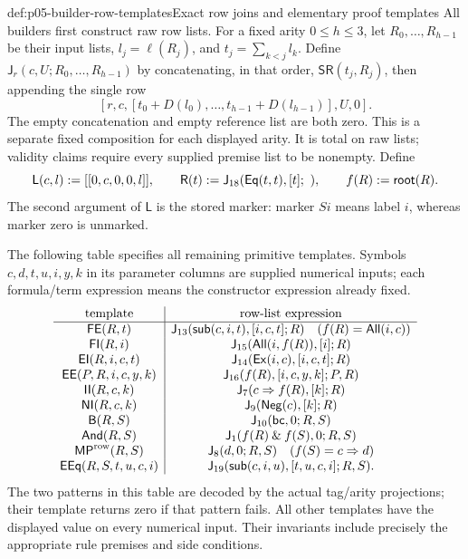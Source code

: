 \begin{hbdefinition}{def:p05-builder-row-templates}{Exact row joins and elementary proof templates}
All builders first construct raw row lists. For a fixed arity
\(0\leq h\leq3\), let \(R_0,\ldots,R_{h-1}\) be their input lists,
\(l_j=\ell(R_j)\), and \(t_j=\sum_{k<j}l_k\). Define
\(\mathsf{J}_r(c,U;R_0,\ldots,R_{h-1})\) by concatenating, in that
order, \(\mathsf{SR}(t_j,R_j)\), then appending the single row
\[
 [r,c,[t_0+D(l_0),\ldots,t_{h-1}+D(l_{h-1})],U,0].
\]
The empty concatenation and empty reference list are both zero. This is a
separate fixed composition for each displayed arity. It is total on raw
lists; validity claims require every supplied premise list to be nonempty.
Define
\[
 \mathsf{L}(c,l)\mathrel{:=}[[0,c,0,0,l]],\qquad
 \mathsf{R}(t)\mathrel{:=}\mathsf{J}_{18}(\mathsf{Eq}(t,t),[t];\ ),
 \qquad f(R)\mathrel{:=}\mathsf{root}(R).
\]
The second argument of \(\mathsf L\) is the stored marker: marker \(Si\)
means label \(i\), whereas marker zero is unmarked.

The following table specifies all remaining primitive templates. Symbols
\(c,d,t,u,i,y,k\) in its parameter columns are supplied numerical inputs;
each formula/term expression means the constructor expression already fixed.
\[
\begin{array}{c|c}
\text{template}&\text{row-list expression}\\\hline
 \mathsf{FE}(R,t)&
 \mathsf J_{13}(\mathsf{sub}(c,i,t),[i,c,t];R)
       \quad(f(R)=\mathsf{All}(i,c))\\
 \mathsf{FI}(R,i)&\mathsf J_{15}(\mathsf{All}(i,f(R)),[i];R)\\
 \mathsf{EI}(R,i,c,t)&\mathsf J_{14}(\mathsf{Ex}(i,c),[i,c,t];R)\\
 \mathsf{EE}(P,R,i,c,y,k)&\mathsf J_{16}(f(R),[i,c,y,k];P,R)\\
 \mathsf{II}(R,c,k)&\mathsf J_7(c\Rightarrow f(R),[k];R)\\
 \mathsf{NI}(R,c,k)&\mathsf J_9(\mathsf{Neg}(c),[k];R)\\
 \mathsf{B}(R,S)&\mathsf J_{10}(\mathsf{bc},0;R,S)\\
 \mathsf{And}(R,S)&\mathsf J_1(f(R)\mathbin{\&}f(S),0;R,S)\\
 \mathsf{MP}^{\rm row}(R,S)&\mathsf J_8(d,0;R,S)
                         \quad(f(S)=c\Rightarrow d)\\
 \mathsf{EEq}(R,S,t,u,c,i)&
       \mathsf J_{19}(\mathsf{sub}(c,i,u),[t,u,c,i];R,S).
\end{array}
\]
The two patterns in this table are decoded by the actual tag/arity
projections; their template returns zero if that pattern fails. All other
templates have the displayed value on every numerical input. Their invariants
include precisely the appropriate rule premises and side conditions.


\end{hbdefinition}
